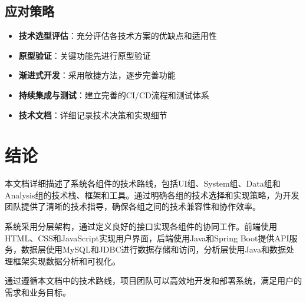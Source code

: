 \documentclass[a4paper,12pt]{article}
\begin{document}
\subsection{应对策略}

\begin{itemize}
  \item \textbf{技术选型评估}：充分评估各技术方案的优缺点和适用性
  \item \textbf{原型验证}：关键功能先进行原型验证
  \item \textbf{渐进式开发}：采用敏捷方法，逐步完善功能
  \item \textbf{持续集成与测试}：建立完善的CI/CD流程和测试体系
  \item \textbf{技术文档}：详细记录技术决策和实现细节
\end{itemize}

\section{结论}

本文档详细描述了系统各组件的技术路线，包括UI组、System组、Data组和Analysis组的技术栈、框架和工具。通过明确各组的技术选择和实现策略，为开发团队提供了清晰的技术指导，确保各组之间的技术兼容性和协作效率。

系统采用分层架构，通过定义良好的接口实现各组件的协同工作。前端使用HTML、CSS和JavaScript实现用户界面，后端使用Java和Spring Boot提供API服务，数据层使用MySQL和JDBC进行数据存储和访问，分析层使用Java和数据处理框架实现数据分析和可视化。

通过遵循本文档中的技术路线，项目团队可以高效地开发和部署系统，满足用户的需求和业务目标。
\end{document}

